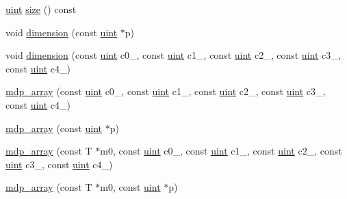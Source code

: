\begin{DoxyCompactItemize}
\hyperlink{mdp__global__vars_8h_a91ad9478d81a7aaf2593e8d9c3d06a14}{uint} \hyperlink{classmdp__array_a4b68d139d11d40eb148a778c43779e4f}{size} () const
\item 
void \hyperlink{classmdp__array_a6a3d01021b01c27ea0a0cf43dd442ad5}{dimension} (const \hyperlink{mdp__global__vars_8h_a91ad9478d81a7aaf2593e8d9c3d06a14}{uint} $\ast$p)
\item 
void \hyperlink{classmdp__array_a816b392dd8ab232c18818e6f186127aa}{dimension} (const \hyperlink{mdp__global__vars_8h_a91ad9478d81a7aaf2593e8d9c3d06a14}{uint} c0\+\_, const \hyperlink{mdp__global__vars_8h_a91ad9478d81a7aaf2593e8d9c3d06a14}{uint} c1\+\_, const \hyperlink{mdp__global__vars_8h_a91ad9478d81a7aaf2593e8d9c3d06a14}{uint} c2\+\_, const \hyperlink{mdp__global__vars_8h_a91ad9478d81a7aaf2593e8d9c3d06a14}{uint} c3\+\_, const \hyperlink{mdp__global__vars_8h_a91ad9478d81a7aaf2593e8d9c3d06a14}{uint} c4\+\_)
\item 
\hyperlink{classmdp__array_a231c442576ed1a88e333fb88bcedef41}{mdp\+\_\+array} (const \hyperlink{mdp__global__vars_8h_a91ad9478d81a7aaf2593e8d9c3d06a14}{uint} c0\+\_, const \hyperlink{mdp__global__vars_8h_a91ad9478d81a7aaf2593e8d9c3d06a14}{uint} c1\+\_, const \hyperlink{mdp__global__vars_8h_a91ad9478d81a7aaf2593e8d9c3d06a14}{uint} c2\+\_, const \hyperlink{mdp__global__vars_8h_a91ad9478d81a7aaf2593e8d9c3d06a14}{uint} c3\+\_, const \hyperlink{mdp__global__vars_8h_a91ad9478d81a7aaf2593e8d9c3d06a14}{uint} c4\+\_)
\item 
\hyperlink{classmdp__array_a7bdd0c532c8517bf46bceab7c48f3186}{mdp\+\_\+array} (const \hyperlink{mdp__global__vars_8h_a91ad9478d81a7aaf2593e8d9c3d06a14}{uint} $\ast$p)
\item 
\hyperlink{classmdp__array_abf3b0ca804544eac3be7d8e499eeb089}{mdp\+\_\+array} (const T $\ast$m0, const \hyperlink{mdp__global__vars_8h_a91ad9478d81a7aaf2593e8d9c3d06a14}{uint} c0\+\_, const \hyperlink{mdp__global__vars_8h_a91ad9478d81a7aaf2593e8d9c3d06a14}{uint} c1\+\_, const \hyperlink{mdp__global__vars_8h_a91ad9478d81a7aaf2593e8d9c3d06a14}{uint} c2\+\_, const \hyperlink{mdp__global__vars_8h_a91ad9478d81a7aaf2593e8d9c3d06a14}{uint} c3\+\_, const \hyperlink{mdp__global__vars_8h_a91ad9478d81a7aaf2593e8d9c3d06a14}{uint} c4\+\_)
\item 
\hyperlink{classmdp__array_a1932c8ea14f2fc8cb7343f9834154521}{mdp\+\_\+array} (const T $\ast$m0, const \hyperlink{mdp__global__vars_8h_a91ad9478d81a7aaf2593e8d9c3d06a14}{uint} $\ast$p)
\item 

\end{DoxyCompactItemize}
